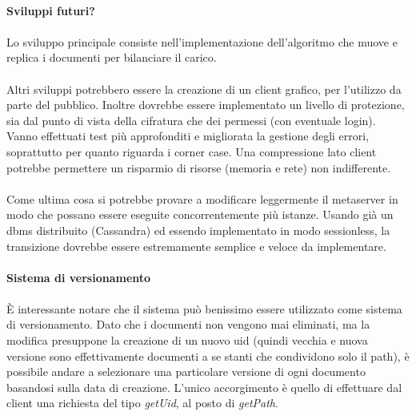 \documentclass[11pt,a4paper,english]{article}
\begin{document}
\paragraph{Sviluppi futuri?}

\paragraph{} Lo sviluppo principale consiste nell'implementazione dell'algoritmo che muove e replica i documenti per bilanciare il carico.

\paragraph{} Altri sviluppi potrebbero essere la creazione di un client grafico, per l'utilizzo da parte del pubblico. Inoltre dovrebbe essere implementato un livello di protezione, sia dal punto di vista della cifratura che dei permessi (con eventuale login). Vanno effettuati test più approfonditi e migliorata la gestione degli errori, soprattutto per quanto riguarda i corner case. Una compressione lato client potrebbe permettere un risparmio di risorse (memoria e rete) non indifferente. 

\paragraph{} Come ultima cosa si potrebbe provare a modificare leggermente il metaserver in modo che possano essere eseguite concorrentemente più istanze. Usando già un dbms distribuito (Cassandra) ed essendo implementato in modo sessionless, la transizione dovrebbe essere estremamente semplice e veloce da implementare.

\paragraph{Sistema di versionamento}

\paragraph{} È interessante notare che il sistema può benissimo essere utilizzato come sistema di versionamento. Dato che i documenti non vengono mai eliminati, ma la modifica presuppone la creazione di un nuovo uid (quindi vecchia e nuova versione sono effettivamente documenti a se stanti che condividono solo il path), è possibile andare a selezionare una particolare versione di ogni documento basandosi sulla data di creazione. L'unico accorgimento è quello di effettuare dal client una richiesta del tipo \emph{getUid}, al posto di \emph{getPath}.
\end{document}
